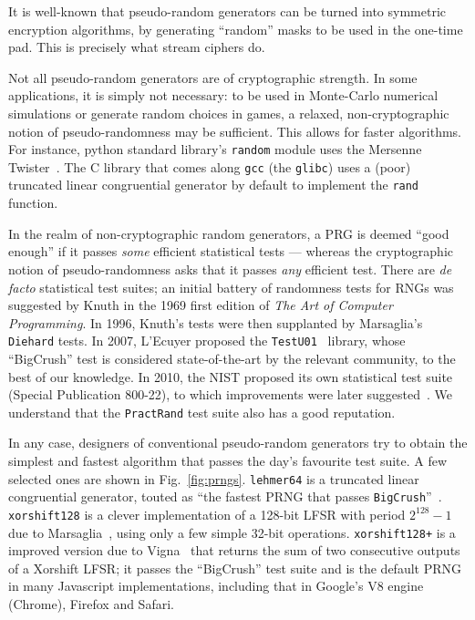 \documentclass[journal=tosc,final]{iacrtrans}
\begin{document}
It is well-known that pseudo-random generators can be turned into symmetric
encryption algorithms, by generating ``random'' masks to be used in the one-time
pad. This is precisely what stream ciphers do.

Not all pseudo-random generators are of cryptographic strength. In some
applications, it is simply not necessary: to be used in Monte-Carlo numerical
simulations or generate random choices in games, a relaxed, non-cryptographic
notion of pseudo-randomness may be sufficient. This allows for faster
algorithms. For instance, \textsf{python} standard library's \texttt{random}
module uses the Mersenne Twister~\cite{MatsumotoN98}. The \textsf{C} library
that comes along \texttt{gcc} (the \texttt{glibc}) uses a (poor) truncated
linear congruential generator by default to implement the \texttt{rand}
function.

In the realm of non-cryptographic random generators, a PRG is deemed ``good
enough'' if it passes \emph{some} efficient statistical tests --- whereas the
cryptographic notion of pseudo-randomness asks that it passes \emph{any}
efficient test. There are \textit{de facto} statistical test suites; an initial
battery of randomness tests for RNGs was suggested by Knuth in the 1969 first
edition of \emph{The Art of Computer Programming}. In 1996, Knuth's tests were then
supplanted by Marsaglia's \texttt{Diehard} tests. In 2007, L'Ecuyer proposed
the \texttt{TestU01}~\cite{LEcuyerS07} library, whose ``BigCrush'' test is
considered state-of-the-art by the relevant community, to the best of our
knowledge. In 2010, the NIST proposed its own statistical test suite (Special
Publication 800-22), to which improvements were later
suggested~\cite{ZhuMLZJ16}. We understand that the \texttt{PractRand} test suite
also has a good reputation.

In any case, designers of conventional pseudo-random generators try to obtain
the simplest and fastest algorithm that passes the day's favourite test suite. A
few selected ones are shown in Fig.~\ref{fig:prngs}. \texttt{lehmer64} is a
truncated linear congruential generator, touted as ``the fastest PRNG that
passes \texttt{BigCrush}''~\cite{LemireLehmer}. \texttt{xorshift128} is a clever
implementation of a 128-bit LFSR with period $2^{128} - 1$ due to
Marsaglia~\cite{Marsaglia03}, using only a few simple 32-bit
operations. \texttt{xorshift128+} is a improved version due to
Vigna~\cite{Vigna17} that returns the sum of two consecutive outputs of a
Xorshift LFSR; it passes the ``BigCrush'' test suite and is the default PRNG in
many Javascript implementations, including that in Google's V8 engine (Chrome),
Firefox and Safari.
\end{document}
